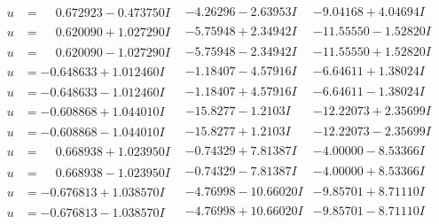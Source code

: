 \documentclass[1p]{elsarticle_modified}
\theoremstyle{definition}
\begin{document}
$$\begin{array}{c|c|c}
\begin{aligned}
u &= \phantom{-}0.672923 - 0.473750 I\end{aligned}
 & -4.26296 - 2.63953 I & -9.04168 + 4.04694 I \\ \hline\begin{aligned}
u &= \phantom{-}0.620090 + 1.027290 I\end{aligned}
 & -5.75948 + 2.34942 I & -11.55550 - 1.52820 I \\ \hline\begin{aligned}
u &= \phantom{-}0.620090 - 1.027290 I\end{aligned}
 & -5.75948 - 2.34942 I & -11.55550 + 1.52820 I \\ \hline\begin{aligned}
u &= -0.648633 + 1.012460 I\end{aligned}
 & -1.18407 - 4.57916 I & -6.64611 + 1.38024 I \\ \hline\begin{aligned}
u &= -0.648633 - 1.012460 I\end{aligned}
 & -1.18407 + 4.57916 I & -6.64611 - 1.38024 I \\ \hline\begin{aligned}
u &= -0.608868 + 1.044010 I\end{aligned}
 & -15.8277 - 1.2103 I & -12.22073 + 2.35699 I \\ \hline\begin{aligned}
u &= -0.608868 - 1.044010 I\end{aligned}
 & -15.8277 + 1.2103 I & -12.22073 - 2.35699 I \\ \hline\begin{aligned}
u &= \phantom{-}0.668938 + 1.023950 I\end{aligned}
 & -0.74329 + 7.81387 I & -4.00000 - 8.53366 I \\ \hline\begin{aligned}
u &= \phantom{-}0.668938 - 1.023950 I\end{aligned}
 & -0.74329 - 7.81387 I & -4.00000 + 8.53366 I \\ \hline\begin{aligned}
u &= -0.676813 + 1.038570 I\end{aligned}
 & -4.76998 - 10.66020 I & -9.85701 + 8.71110 I \\ \hline\begin{aligned}
u &= -0.676813 - 1.038570 I\end{aligned}
 & -4.76998 + 10.66020 I & -9.85701 - 8.71110 I \\ \hline\begin{aligned}

\end{aligned}
\end{array}$$
\end{document}
